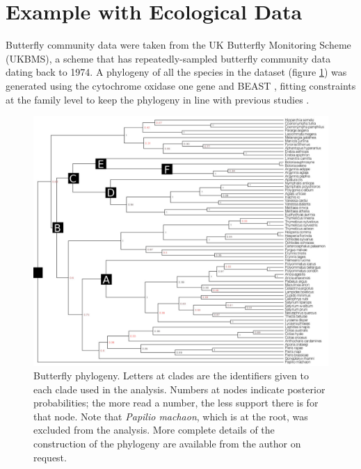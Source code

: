 \documentclass[12pt]{amsart}
\begin{document}
\section{Example with Ecological Data}
Butterfly community data were taken from the UK Butterfly Monitoring Scheme (UKBMS), a scheme that has repeatedly-sampled butterfly community data dating back to 1974. A phylogeny of all the species in the dataset (figure \ref{phylogeny}) was generated using the cytochrome oxidase one gene and BEAST \citep{Drummond2006,Drummond2007,Drummond2012}, fitting constraints at the family level to keep the phylogeny in line with previous studies \citep{Mutanen2010,Wahlberg2010}.
\begin{figure}
\begin{center}
\includegraphics[width=\textwidth]{phylogeny}
\caption{Butterfly phylogeny. Letters at clades are the identifiers given to each clade used in the analysis. Numbers at nodes indicate posterior probabilities; the more read a number, the less support there is for that node. Note that \emph{Papilio machaon}, which is at the root, was excluded from the analysis. More complete details of the construction of the phylogeny are available from the author on request.}
\label{phylogeny}
\end{center}
\end{figure}
\end{document}
